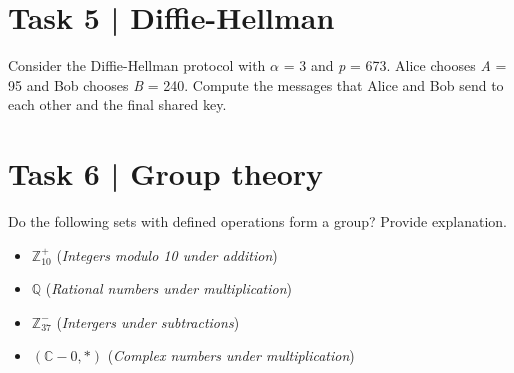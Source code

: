\documentclass{article}
\begin{document}
\section*{Task 5 | Diffie-Hellman}
Consider the Diffie-Hellman protocol with $\alpha$ = 3 and \textit{p} = 673. Alice chooses
\textit{A} = 95 and Bob chooses \textit{B} = 240. Compute the messages that Alice and Bob
send to each other and the final shared key.


\section*{Task 6 | Group theory}
Do the following sets with defined operations form a group? Provide explanation.
\begin{itemize}
    \item $\mathbb{Z}_{10}^+$ (\textit{Integers modulo 10 under addition})
    \item $\mathbb{Q}$ (\textit{Rational numbers under multiplication}) 
    \item $\mathbb{Z}_{37}^-$ (\textit{Intergers under subtractions})
    \item $(\mathbb{C} - 0, *)$ (\textit{Complex numbers under multiplication})
\end{itemize}
\end{document}
